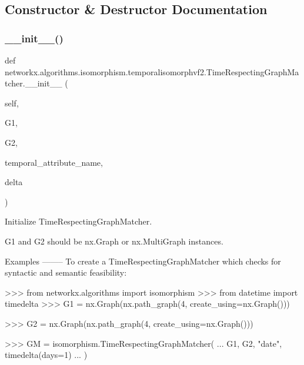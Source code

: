 \subsection{Constructor \& Destructor Documentation}
\mbox{\label{classnetworkx_1_1algorithms_1_1isomorphism_1_1temporalisomorphvf2_1_1TimeRespectingGraphMatcher_a7a1d6e83d779f5b84de2ad96b3572b47}} 
\subsubsection{\texorpdfstring{\+\_\+\+\_\+init\+\_\+\+\_\+()}{\_\_init\_\_()}}
{\footnotesize\ttfamily def networkx.\+algorithms.\+isomorphism.\+temporalisomorphvf2.\+Time\+Respecting\+Graph\+Matcher.\+\_\+\+\_\+init\+\_\+\+\_\+ (\begin{DoxyParamCaption}\item[{}]{self,  }\item[{}]{G1,  }\item[{}]{G2,  }\item[{}]{temporal\+\_\+attribute\+\_\+name,  }\item[{}]{delta }\end{DoxyParamCaption})}

\begin{DoxyVerb}Initialize TimeRespectingGraphMatcher.

G1 and G2 should be nx.Graph or nx.MultiGraph instances.

Examples
--------
To create a TimeRespectingGraphMatcher which checks for
syntactic and semantic feasibility:

>>> from networkx.algorithms import isomorphism
>>> from datetime import timedelta
>>> G1 = nx.Graph(nx.path_graph(4, create_using=nx.Graph()))

>>> G2 = nx.Graph(nx.path_graph(4, create_using=nx.Graph()))

>>> GM = isomorphism.TimeRespectingGraphMatcher(
...     G1, G2, "date", timedelta(days=1)
... )
\end{DoxyVerb}
 

